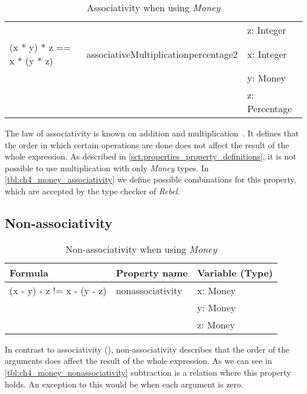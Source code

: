 \begin{table}[!ht]
\begin{tabular}{lll}
                                                   &                                      & z: Integer               \\
\rowcolor[HTML]{EFEFEF} (x * y) * z == x * (y * z) & associativeMultiplicationpercentage2 & x: Integer               \\
\rowcolor[HTML]{EFEFEF}                            &                                      & y: Money                 \\
\rowcolor[HTML]{EFEFEF}                            &                                      & z: Percentage            \\ \hline
\end{tabular}
\caption{Associativity when using \textit{Money}}
\label{tbl:ch4_money_associativity}
\end{table}
\FloatBarrier
The law of associativity is known on addition and
multiplication~\cite{baumgart1961axioms}. It defines that the order in which
certain operations are done does not affect the result of the whole expression.
As described in \autoref{sct:properties_property_definitions}, it is not
possible to use multiplication with only \textit{Money} types. In
\autoref{tbl:ch4_money_associativity} we define possible combinations for this
property, which are accepted by the type checker of \textit{Rebel}.

\subsection*{Non-associativity}
\label{ssct:properties_nonassociativity}
\FloatBarrier
\begin{table}[!ht]
\centering
\begin{tabular}{lll}
\hline
                        \textbf{Formula}           & \textbf{Property name} & \textbf{Variable (Type)} \\ \hline
\rowcolor[HTML]{EFEFEF} (x - y) - z != x - (y - z) & nonassociativity       & x: Money                 \\
\rowcolor[HTML]{EFEFEF}                            &                        & y: Money                 \\
\rowcolor[HTML]{EFEFEF}                            &                        & z: Money                 \\ \hline
\end{tabular}
\caption{Non-associativity when using \textit{Money}}
\label{tbl:ch4_money_nonassociativity}
\end{table}
\FloatBarrier
In contrast to associativity (),
non-associativity describes that the order of the arguments does affect the
result of the whole expression. As we can see in
\autoref{tbl:ch4_money_nonassociativity} subtraction is a relation where this
property holds. An exception to this would be when each argument is zero.

